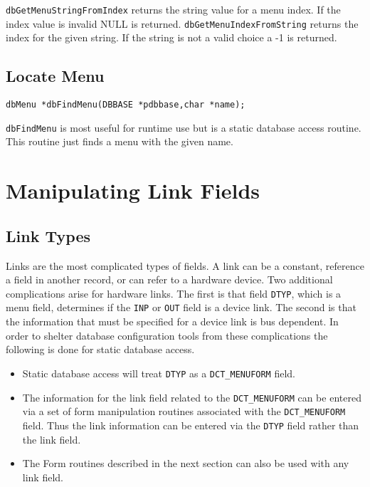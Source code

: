 \verb|dbGetMenuStringFromIndex| returns the string value for a menu index. If the index value is invalid NULL is 
returned. \verb|dbGetMenuIndexFromString| returns the index for the given string. If the string is not a valid choice a -1 
is returned.

\subsection{Locate Menu}

\begin{verbatim}
dbMenu *dbFindMenu(DBBASE *pdbbase,char *name);
\end{verbatim}

\verb|dbFindMenu| is most useful for runtime use but is a static database access routine. This routine just finds a menu with the 
given name.

\section{Manipulating Link Fields}

\subsection{Link Types}

Links are the most complicated types of fields. A link can be a constant, reference a field in another record, or can refer to 
a hardware device. Two additional complications arise for hardware links. The first is that field \verb|DTYP|, which is a menu 
field, determines if the \verb|INP| or \verb|OUT| field is a device link. The second is that the information that must be specified for a 
device link is bus dependent. In order to shelter database configuration tools from these complications the following is 
done for static database access.

\begin{itemize}
\item Static database access will treat \verb|DTYP| as a \verb|DCT_MENUFORM| field.

\item The information for the link field related to the \verb|DCT_MENUFORM| can be entered via a set of form manipulation 
routines associated with the \verb|DCT_MENUFORM| field. Thus the link information can be entered via the \verb|DTYP| field 
rather than the link field.

\item The Form routines described in the next section can also be used with any link field.

\end{itemize}

